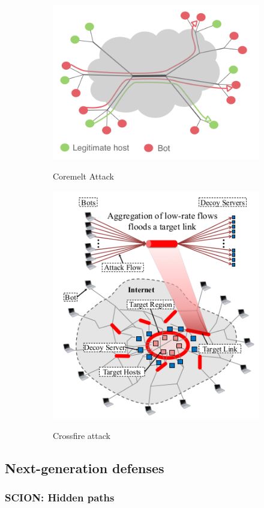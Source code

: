 \documentclass[11pt,oneside,a4paper]{article}
\begin{document}
\begin{figure}[hb]
	\centering
	\begin{subfigure}[t]{.5\textwidth}
		\centering
		\includegraphics[width=0.8\linewidth]{figures/coremelt_attack}
		\label{fig:coremelt_attack}
		\caption{Coremelt Attack}
	\end{subfigure}%
	\begin{subfigure}[t]{.5\textwidth}
		\centering
		\includegraphics[width=0.6\linewidth]{figures/crossfire_attack}
		\label{fig:crossfire_attack}
		\caption{Crossfire attack}
	\end{subfigure}
	\caption{}
\end{figure}

\subsection{Next-generation defenses}

\subsubsection{SCION: Hidden paths}
\end{document}
